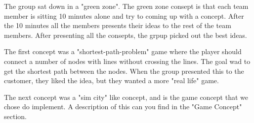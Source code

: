 	The group sat down in a "green zone". The green zone consept is that each team member
	is sitting 10 minutes alone and try to coming up with a concept. After the 10 minutes
	all the members presents their ideas to the rest of the team members.
	After presenting all the consepts, the grpup picked out the best ideas. 

	The first concept was a "shortest-path-problem" game where the player should
	connect a number of nodes with lines without crossing the lines. The goal 
	wad to get the shortest path between the nodes. When the group presented this
	to the customer, they liked the idea, but they wanted a more "real life" game.

	The next concept was a "sim city" like concept, and is the game concept that
	we chose do implement. A description of this can you find in the "Game Concept"
	section. 

